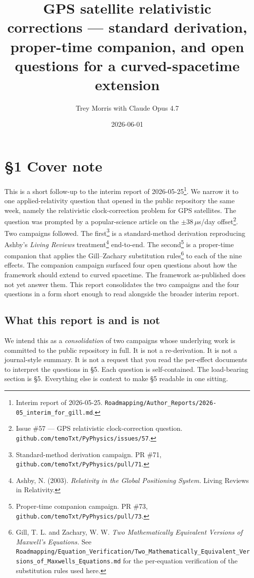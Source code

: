\documentclass[
  11pt,
]{article}
\title{GPS satellite relativistic corrections --- standard derivation,
proper-time companion, and open questions for a curved-spacetime
extension}
\author{Trey Morris with Claude Opus 4.7}
\date{2026-06-01}
\begin{document}
\maketitle

\hypertarget{cover-note}{%
\section{§1 Cover note}\label{cover-note}}

This is a short follow-up to the interim report of
2026-05-25\footnote{Interim report of 2026-05-25.
  \texttt{Roadmapping/Author\_Reports/2026-05\_interim\_for\_gill.md}.}.
We narrow it to one applied-relativity question that opened in the
public repository the same week, namely the relativistic
clock-correction problem for GPS satellites. The question was prompted
by a popular-science article on the \(\pm 38\,\mu\)s/day
offset\footnote{Issue \#57 --- GPS relativistic clock-correction
  question. \texttt{github.com/temoTxt/PyPhysics/issues/57}.}. Two
campaigns followed. The first\footnote{Standard-method derivation
  campaign. PR \#71, \texttt{github.com/temoTxt/PyPhysics/pull/71}.} is
a standard-method derivation reproducing Ashby's \emph{Living Reviews}
treatment\footnote{Ashby, N. (2003). \emph{Relativity in the Global
  Positioning System.} Living Reviews in Relativity.} end-to-end. The
second\footnote{Proper-time companion campaign. PR \#73,
  \texttt{github.com/temoTxt/PyPhysics/pull/73}.} is a proper-time
companion that applies the Gill--Zachary substitution rules\footnote{Gill,
  T. L. and Zachary, W. W. \emph{Two Mathematically Equivalent Versions
  of Maxwell's Equations.} See
  \texttt{Roadmapping/Equation\_Verification/Two\_Mathematically\_Equivalent\_Versions\_of\_Maxwells\_Equations.md}
  for the per-equation verification of the substitution rules used here.}
to each of the nine effects. The companion campaign surfaced four open
questions about how the framework should extend to curved spacetime. The
framework as-published does not yet answer them. This report
consolidates the two campaigns and the four questions in a form short
enough to read alongside the broader interim report.

\hypertarget{what-this-report-is-and-is-not}{%
\subsection{What this report is and is
not}\label{what-this-report-is-and-is-not}}

We intend this as a \emph{consolidation} of two campaigns whose
underlying work is committed to the public repository in full. It is not
a re-derivation. It is not a journal-style summary. It is not a request
that you read the per-effect documents to interpret the questions in §5.
Each question is self-contained. The load-bearing section is §5.
Everything else is context to make §5 readable in one sitting.
\end{document}
